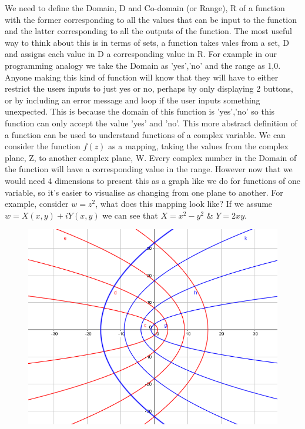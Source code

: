 We need to define the Domain, D and Co-domain (or Range), R of a function with the former corresponding to all the values that can be input to the function and the latter corresponding to all the outputs of the function.
The most useful way to think about this is in terms of sets, a function takes vales from a set, D and assigns each value in D a corresponding value in R.
For example in our programming analogy we take the Domain as {'yes','no'} and the range as {1,0}. 
Anyone making this kind of function will know that they will have to either restrict the users inputs to just yes or no, perhaps by only displaying 2 buttons, or by including an error message and loop if the user inputs something unexpected.
This is because the domain of this function is {'yes','no'} so this function can only accept the value 'yes' and 'no'.
This more abstract definition of a function can be used to understand functions of a complex variable.
We can consider the function $f(z)$ as a mapping, taking the values from the complex plane, Z, to another complex plane, W.
 Every complex number in the Domain of the function will have a corresponding value in the range. However now that we would need 4 dimensions to present this as a graph like we do for functions of one variable, so it's easier to visualise as changing from one plane to another.
 For example, consider $w=z^2$, what does this mapping look like?
  If we assume $w=X(x,y)+iY(x,y)$ we can see that $X=x^2-y^2$ \& $Y=2xy$.
%
\begin{minipage}[t]{0.47\linewidth}
	\begin{figure}[H]
		\centering
		\includegraphics[width=\linewidth]{complex/mapping}
		\captionsetup{font=small} 	
	\end{figure} 
\end{minipage}
